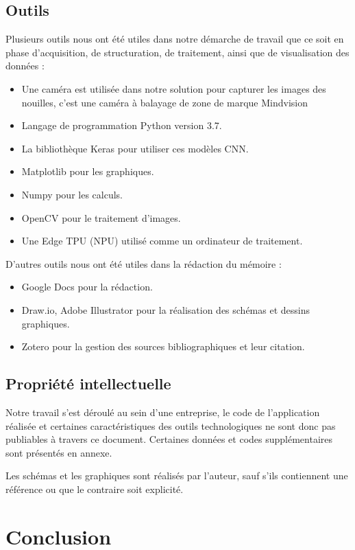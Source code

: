 \subsection{Outils}
Plusieurs outils nous ont été utiles dans notre démarche de travail que ce soit en phase d’acquisition, de structuration, de traitement, ainsi que de visualisation des données :
\begin{itemize}
    \item Une caméra est utilisée dans notre solution pour capturer les images des nouilles, c'est une caméra à balayage de zone de marque Mindvision %
    \item Langage de programmation Python version 3.7. 
    \item La bibliothèque Keras pour utiliser ces modèles CNN.  
    \item Matplotlib pour les graphiques.
    \item Numpy pour les calculs. 
    \item OpenCV pour le traitement d'images. 
    \item Une Edge TPU (NPU) utilisé comme un ordinateur de traitement.
\end{itemize}
\bigskip
\bigskip
D’autres outils nous ont été utiles dans la rédaction du mémoire : 
\begin{itemize}
    \item Google Docs pour la rédaction. 
    \item Draw.io, Adobe Illustrator pour la réalisation des schémas et dessins graphiques. 
    \item Zotero pour la gestion des sources bibliographiques et leur citation.
\end{itemize}

\subsection{Propriété intellectuelle }
Notre travail s'est déroulé au sein d'une entreprise, le code de l'application réalisée et certaines caractéristiques des outils technologiques ne sont donc pas publiables à travers ce document. Certaines données et codes supplémentaires sont présentés en annexe. 

Les schémas et les graphiques sont réalisés par l'auteur, sauf s’ils contiennent une référence ou que le contraire soit explicité. 

\newpage
\section{Conclusion}

